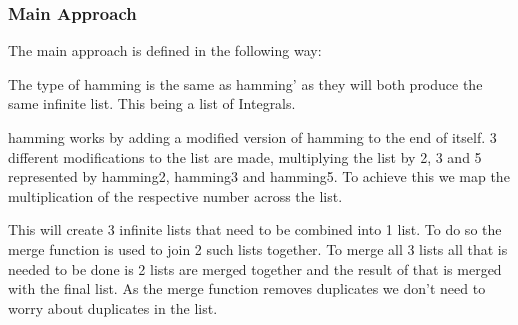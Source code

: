 \documentclass[a4paper]{article}
\begin{document}
\subsubsection{Main Approach}
The main approach is defined in the following way:

\par
The type of hamming is the same as hamming' as they will both produce the same infinite list.
This being a list of Integrals.
\par
hamming works by adding a modified version of hamming to the end of itself.
3 different modifications to the list are made, multiplying the list by 2, 3 and 5 represented by hamming2, hamming3 and hamming5.
To achieve this we map the multiplication of the respective number across the list.
\par
This will create 3 infinite lists that need to be combined into 1 list.
To do so the merge function is used to join 2 such lists together.
To merge all 3 lists all that is needed to be done is 2 lists are merged together and the result of that is merged with the final list.
As the merge function removes duplicates we don't need to worry about duplicates in the list.
\end{document}
